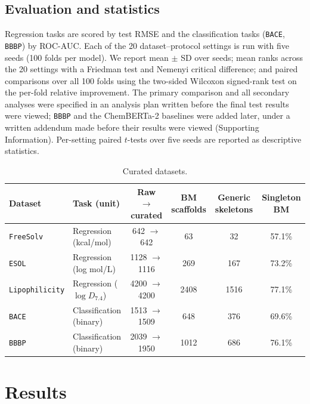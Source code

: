 \documentclass[journal=jcisd8,manuscript=article]{achemso}
\begin{document}
\subsection{Evaluation and statistics}
Regression tasks are scored by test RMSE and the classification tasks (\texttt{BACE}, \texttt{BBBP}) by ROC-AUC. Each of the 20 dataset--protocol settings is run with five seeds (100 folds per model). We report mean $\pm$ SD over seeds; mean ranks across the 20 settings with a Friedman test and Nemenyi critical difference\cite{demsar2006statistical}; and paired comparisons over all 100 folds using the two-sided Wilcoxon signed-rank test on the per-fold relative improvement. The primary comparison and all secondary analyses were specified in an analysis plan written before the final test results were viewed; \texttt{BBBP} and the ChemBERTa-2 baselines were added later, under a written addendum made before their results were viewed (Supporting Information). Per-setting paired $t$-tests over five seeds are reported as descriptive statistics.


\begin{table}
\caption{Curated datasets.}
\label{tab:datasets}
\small
\begin{tabular}{llcccc}
\toprule
Dataset & Task (unit) & Raw $\to$ curated & BM scaffolds & Generic skeletons & Singleton BM \\
\midrule
\texttt{FreeSolv} & Regression (kcal/mol) & 642 $\to$ 642 & 63 & 32 & 57.1\% \\
\texttt{ESOL} & Regression (log mol/L) & 1128 $\to$ 1116 & 269 & 167 & 73.2\% \\
\texttt{Lipophilicity} & Regression ($\log D_{7.4}$) & 4200 $\to$ 4200 & 2408 & 1516 & 77.1\% \\
\texttt{BACE} & Classification (binary) & 1513 $\to$ 1509 & 648 & 376 & 69.6\% \\
\texttt{BBBP} & Classification (binary) & 2039 $\to$ 1950 & 1012 & 686 & 76.1\% \\
\bottomrule
\end{tabular}
\end{table}

\section{Results}
\end{document}
